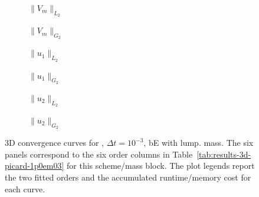 \begin{figure}[p]
\centering
\begin{subfigure}{0.485\linewidth}
\centering
{}
\caption{$\|V_m\|_{L_2}$}
\label{fig:results-3d-picard-1p0em03-backwardeuler-lumped-a}
\end{subfigure}
\hfill
\begin{subfigure}{0.485\linewidth}
\centering
{}
\caption{$\|V_m\|_{G_2}$}
\label{fig:results-3d-picard-1p0em03-backwardeuler-lumped-b}
\end{subfigure}
\par\vspace{0.8em}
\begin{subfigure}{0.485\linewidth}
\centering
{}
\caption{$\|u_1\|_{L_2}$}
\label{fig:results-3d-picard-1p0em03-backwardeuler-lumped-c}
\end{subfigure}
\hfill
\begin{subfigure}{0.485\linewidth}
\centering
{}
\caption{$\|u_1\|_{G_2}$}
\label{fig:results-3d-picard-1p0em03-backwardeuler-lumped-d}
\end{subfigure}
\par\vspace{0.8em}
\begin{subfigure}{0.485\linewidth}
\centering
{}
\caption{$\|u_2\|_{L_2}$}
\label{fig:results-3d-picard-1p0em03-backwardeuler-lumped-e}
\end{subfigure}
\hfill
\begin{subfigure}{0.485\linewidth}
\centering
{}
\caption{$\|u_2\|_{G_2}$}
\label{fig:results-3d-picard-1p0em03-backwardeuler-lumped-f}
\end{subfigure}
\caption{3D convergence curves for , $\Delta t=10^{-3}$, bE with lump. mass. The six panels correspond to the six order columns in Table~\ref{tab:results-3d-picard-1p0em03} for this scheme/mass block. The plot legends report the two fitted orders and the accumulated runtime/memory cost for each curve.}
\label{fig:results-3d-picard-1p0em03-backwardeuler-lumped}
\end{figure}
\FloatBarrier

